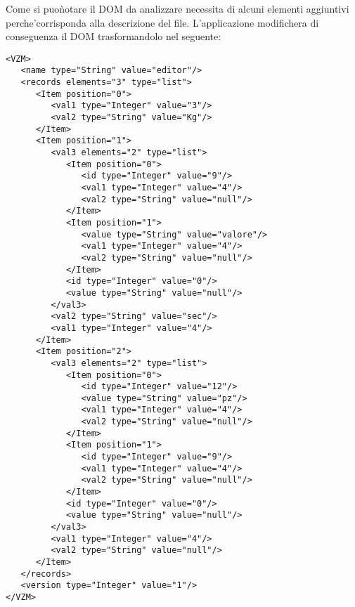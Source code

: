 \documentclass[11pt,titlepage,a4paper,twoside,openany]{book}
\begin{document}
Come si puo\` notare il DOM da analizzare necessita di alcuni elementi aggiuntivi perche'corrisponda alla descrizione del file.
L'applicazione modifichera di conseguenza il DOM trasformandolo nel seguente:

\lstset{language=HTML}
\begin{lstlisting}
<VZM>
   <name type="String" value="editor"/>
   <records elements="3" type="list">
      <Item position="0">
         <val1 type="Integer" value="3"/>
         <val2 type="String" value="Kg"/>
      </Item>
      <Item position="1">
         <val3 elements="2" type="list">
            <Item position="0">
               <id type="Integer" value="9"/>
               <val1 type="Integer" value="4"/>
               <val2 type="String" value="null"/>
            </Item>
            <Item position="1">
               <value type="String" value="valore"/>
               <val1 type="Integer" value="4"/>
               <val2 type="String" value="null"/>
            </Item>
            <id type="Integer" value="0"/>
            <value type="String" value="null"/>
         </val3>
         <val2 type="String" value="sec"/>
         <val1 type="Integer" value="4"/>
      </Item>
      <Item position="2">
         <val3 elements="2" type="list">
            <Item position="0">
               <id type="Integer" value="12"/>
               <value type="String" value="pz"/>
               <val1 type="Integer" value="4"/>
               <val2 type="String" value="null"/>
            </Item>
            <Item position="1">
               <id type="Integer" value="9"/>
               <val1 type="Integer" value="4"/>
               <val2 type="String" value="null"/>
            </Item>
            <id type="Integer" value="0"/>
            <value type="String" value="null"/>
         </val3>
         <val1 type="Integer" value="4"/>
         <val2 type="String" value="null"/>
      </Item>
   </records>
   <version type="Integer" value="1"/>
</VZM>
\end{lstlisting}
\end{document}

